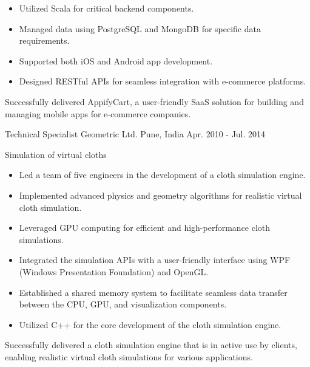 \begin{cventries}
{\begin{cvitems}
\begin{itemize}
          \item Utilized Scala for critical backend components.
          \item Managed data using PostgreSQL and MongoDB for specific data requirements.
          \item Supported both iOS and Android app development.
          \item Designed RESTful APIs for seamless integration with e-commerce platforms.
          \end{itemize}
        Successfully delivered AppifyCart, a user-friendly SaaS solution for building and managing mobile apps for e-commerce companies.
      \end{cvitems}
    }

  \cventry
    {Technical Specialist} %
    {Geometric Ltd.} %
    {Pune, India} %
    {Apr. 2010 - Jul. 2014} %
    {
      \begin{cvitems} %
        \item{Simulation of virtual cloths}
        \begin{itemize}
        \item Led a team of five engineers in the development of a cloth simulation engine.
        \item Implemented advanced physics and geometry algorithms for realistic virtual cloth simulation.
        \item Leveraged GPU computing for efficient and high-performance cloth simulations.
        \item Integrated the simulation APIs with a user-friendly interface using WPF (Windows Presentation Foundation) and OpenGL.
        \item Established a shared memory system to facilitate seamless data transfer between the CPU, GPU, and visualization components.
        \item Utilized C++ for the core development of the cloth simulation engine.
        \end{itemize}
        Successfully delivered a cloth simulation engine that is in active use by clients, enabling realistic virtual cloth simulations for various applications.
      \end{cvitems}
    }


\end{cventries}
